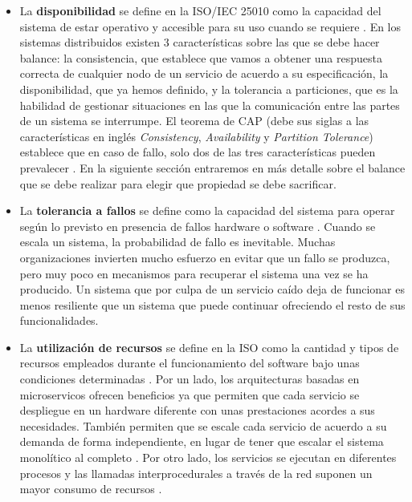 \documentclass[11pt,spanish,listoffigures]{tfgetsinf}
\begin{document}
\begin{itemize}

\item La \textbf{disponibilidad} se define en la ISO/IEC 25010 como la capacidad del sistema de estar operativo y accesible para su uso cuando se requiere \cite{Standard2010}. En los sistemas distribuidos existen 3 características sobre las que se debe hacer balance: la consistencia, que establece que vamos a obtener una respuesta correcta de cualquier nodo de un servicio de acuerdo a su especificación, la disponibilidad, que ya hemos definido, y la tolerancia a particiones, que es la habilidad de gestionar situaciones en las que la comunicación entre las partes de un sistema se interrumpe. El teorema de CAP (debe sus siglas a las características en inglés \textit{Consistency}, \textit{Availability} y \textit{Partition Tolerance}) establece que en caso de fallo, solo dos de las tres características pueden prevalecer \cite{Gilbert2012}. En la siguiente sección entraremos en más detalle sobre el balance que se debe realizar para elegir que propiedad se debe sacrificar.

\item La \textbf{tolerancia a fallos} se define como la capacidad del sistema para operar según lo previsto en presencia de fallos hardware o software \cite{Standard2010}. Cuando se escala un sistema, la probabilidad de fallo es inevitable. Muchas organizaciones invierten mucho esfuerzo en evitar que un fallo se produzca, pero muy poco en mecanismos para recuperar el sistema una vez se ha producido. Un sistema que por culpa de un servicio caído deja de funcionar es menos resiliente que un sistema que puede continuar ofreciendo el resto de sus funcionalidades.

\item La \textbf{utilización de recursos} se define en la ISO como la cantidad y tipos de recursos empleados durante el funcionamiento del software bajo unas condiciones determinadas \cite{Standard2010}. Por un lado, los arquitecturas basadas en microservicos ofrecen beneficios ya que permiten que cada servicio se despliegue en un hardware diferente con unas prestaciones acordes a sus necesidades. También permiten que se escale cada servicio de acuerdo a su demanda de forma independiente, en lugar de tener que escalar el sistema monolítico al completo \cite{DelaTorre2018}. Por otro lado, los servicios se ejecutan en diferentes procesos y las llamadas interprocedurales a través de la red suponen un mayor consumo de recursos \cite{FowlerSusan}.


\end{itemize}
\end{document}
